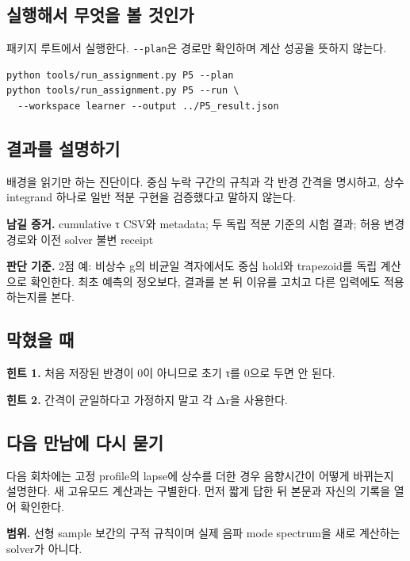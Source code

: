 \documentclass[
  10pt,
  a4paper,
]{article}
\begin{document}
\newpage

\subsection{실행해서 무엇을 볼
것인가}\label{uxc2e4uxd589uxd574uxc11c-uxbb34uxc5c7uxc744-uxbcfc-uxac83uxc778uxac00}

패키지 루트에서 실행한다. \texttt{-\/-plan}은 경로만 확인하며 계산
성공을 뜻하지 않는다.

\begin{verbatim}
python tools/run_assignment.py P5 --plan
python tools/run_assignment.py P5 --run \
  --workspace learner --output ../P5_result.json
\end{verbatim}

\subsection{결과를
설명하기}\label{uxacb0uxacfcuxb97c-uxc124uxba85uxd558uxae30}

배경을 읽기만 하는 진단이다. 중심 누락 구간의 규칙과 각 반경 간격을
명시하고, 상수 integrand 하나로 일반 적분 구현을 검증했다고 말하지
않는다.

\textbf{남길 증거.} cumulative τ CSV와 metadata; 두 독립 적분 기준의
시험 결과; 허용 변경 경로와 이전 solver 불변 receipt

\textbf{판단 기준.} 2점 예: 비상수 g의 비균일 격자에서도 중심 hold와
trapezoid를 독립 계산으로 확인한다. 최초 예측의 정오보다, 결과를 본 뒤
이유를 고치고 다른 입력에도 적용하는지를 본다.

\subsection{막혔을 때}\label{uxb9c9uxd614uxc744-uxb54c}

\textbf{힌트 1.} 처음 저장된 반경이 0이 아니므로 초기 τ를 0으로 두면 안
된다.

\textbf{힌트 2.} 간격이 균일하다고 가정하지 말고 각 Δr을 사용한다.

\subsection{다음 만남에 다시
묻기}\label{uxb2e4uxc74c-uxb9ccuxb0a8uxc5d0-uxb2e4uxc2dc-uxbb3buxae30}

다음 회차에는 고정 profile의 lapse에 상수를 더한 경우 음향시간이 어떻게
바뀌는지 설명한다. 새 고유모드 계산과는 구별한다. 먼저 짧게 답한 뒤
본문과 자신의 기록을 열어 확인한다.

\textbf{범위.} 선형 sample 보간의 구적 규칙이며 실제 음파 mode
spectrum을 새로 계산하는 solver가 아니다.
\end{document}
